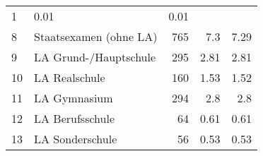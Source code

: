\begin{longtable}{lXrrr}
       \num{1} &
       \num[round-mode=places,round-precision=2]{0.01} &
         \num[round-mode=places,round-precision=2]{0.01} \\

     8 &
     \multicolumn{1}{X}{ Staatsexamen (ohne LA)   } &


       \num{765} &
       \num[round-mode=places,round-precision=2]{7.3} &
         \num[round-mode=places,round-precision=2]{7.29} \\

     9 &
     \multicolumn{1}{X}{ LA Grund-/Hauptschule   } &


       \num{295} &
       \num[round-mode=places,round-precision=2]{2.81} &
         \num[round-mode=places,round-precision=2]{2.81} \\

     10 &
     \multicolumn{1}{X}{ LA Realschule   } &


       \num{160} &
       \num[round-mode=places,round-precision=2]{1.53} &
         \num[round-mode=places,round-precision=2]{1.52} \\

     11 &
     \multicolumn{1}{X}{ LA Gymnasium   } &


       \num{294} &
       \num[round-mode=places,round-precision=2]{2.8} &
         \num[round-mode=places,round-precision=2]{2.8} \\

     12 &
     \multicolumn{1}{X}{ LA Berufsschule   } &


       \num{64} &
       \num[round-mode=places,round-precision=2]{0.61} &
         \num[round-mode=places,round-precision=2]{0.61} \\

     13 &
     \multicolumn{1}{X}{ LA Sonderschule   } &


       \num{56} &
       \num[round-mode=places,round-precision=2]{0.53} &
         \num[round-mode=places,round-precision=2]{0.53} \\


\end{longtable}
